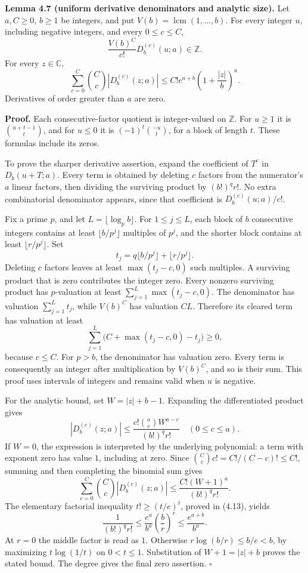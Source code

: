 \documentclass[
  11pt,
  a4paper,
]{article}
\begin{document}
\textbf{Lemma 4.7 (uniform derivative denominators and analytic size).}
Let \(a,C\ge0\), \(b\ge1\) be integers, and put
\(V(b)=\operatorname{lcm}(1,\ldots,b)\). For every integer \(u\),
including negative integers, and every \(0\le c\le C\), \[
\frac{V(b)^C}{c!}D_b^{(c)}(u;a)\in\mathbb Z.
\] For every \(z\in\mathbb C\), \[
\sum_{c=0}^{C}\binom Cc\left|D_b^{(c)}(z;a)\right|
\le C!e^{a+b}\left(1+\frac{|z|}{b}\right)^a.
\] Derivatives of order greater than \(a\) are zero.

\textbf{Proof.} Each consecutive-factor quotient is integer-valued on
\(\mathbb Z\). For \(u\ge1\) it is \(\binom{u+t-1}{t}\), and for
\(u\le0\) it is \((-1)^t\binom{-u}{t}\), for a block of length \(t\).
These formulas include its zeros.

To prove the sharper derivative assertion, expand the coefficient of
\(T^c\) in \(D_b(u+T;a)\). Every term is obtained by deleting \(c\)
factors from the numerator's \(a\) linear factors, then dividing the
surviving product by \((b!)^qr!\). No extra combinatorial denominator
appears, since that coefficient is \(D_b^{(c)}(u;a)/c!\).

Fix a prime \(p\), and let \(L=\lfloor\log_p b\rfloor\). For
\(1\le j\le L\), each block of \(b\) consecutive integers contains at
least \(\lfloor b/p^j\rfloor\) multiples of \(p^j\), and the shorter
block contains at least \(\lfloor r/p^j\rfloor\). Set \[
t_j=q\lfloor b/p^j\rfloor+\lfloor r/p^j\rfloor.
\] Deleting \(c\) factors leaves at least \(\max(t_j-c,0)\) such
multiples. A surviving product that is zero contributes the integer
zero. Every nonzero surviving product has \(p\)-valuation at least
\(\sum_{j=1}^{L}\max(t_j-c,0)\). The denominator has valuation
\(\sum_{j=1}^{L}t_j\), while \(V(b)^C\) has valuation \(CL\). Therefore
its cleared term has valuation at least \[
\sum_{j=1}^{L}\bigl(C+\max(t_j-c,0)-t_j\bigr)\ge0,
\] because \(c\le C\). For \(p>b\), the denominator has valuation zero.
Every term is consequently an integer after multiplication by
\(V(b)^C\), and so is their sum. This proof uses intervals of integers
and remains valid when \(u\) is negative.

For the analytic bound, set \(W=|z|+b-1\). Expanding the differentiated
product gives \[
|D_b^{(c)}(z;a)|\le
\frac{c!\binom ac W^{a-c}}{(b!)^qr!}\quad(0\le c\le a).
\] If \(W=0\), the expression is interpreted by the underlying
polynomial: a term with exponent zero has value \(1\), including at
zero. Since \(\binom Cc c!=C!/(C-c)!\le C!\), summing and then
completing the binomial sum gives \[
\sum_{c=0}^{C}\binom Cc|D_b^{(c)}(z;a)|
\le \frac{C!(W+1)^a}{(b!)^qr!}.
\] The elementary factorial inequality \(t!\ge(t/e)^t\), proved in
(4.13), yields \[
\frac1{(b!)^qr!}\le
\frac{e^a}{b^a}\left(\frac br\right)^r
\le \frac{e^{a+b}}{b^a}.
\] At \(r=0\) the middle factor is read as \(1\). Otherwise
\(r\log(b/r)\le b/e<b\), by maximizing \(t\log(1/t)\) on \(0<t\le1\).
Substitution of \(W+1=|z|+b\) proves the stated bound. The degree gives
the final zero assertion. \(\square\)
\end{document}
